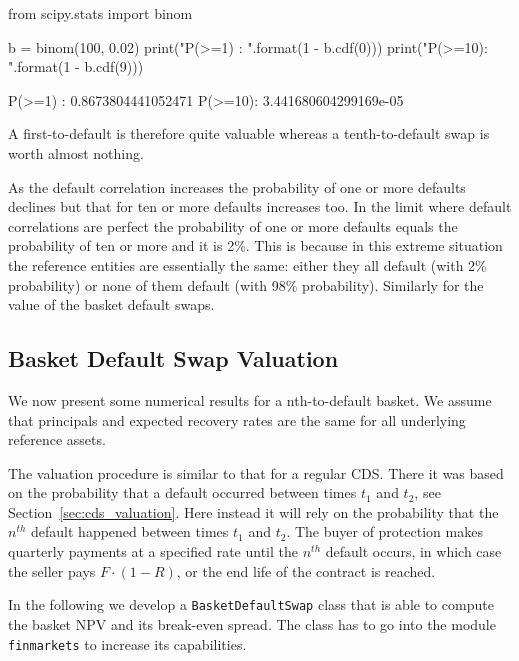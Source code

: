 \begin{ipython}
from scipy.stats import binom

b = binom(100, 0.02)
print("P(>=1) : {}".format(1 - b.cdf(0)))
print("P(>=10): {}".format(1 - b.cdf(9)))
\end{ipython}
\begin{ioutput}
P(>=1) : 0.8673804441052471
P(>=10): 3.441680604299169e-05
\end{ioutput}

A first-to-default is therefore quite valuable whereas a tenth-to-default swap is worth almost nothing.

As the default correlation increases the probability of one or more defaults declines but that for ten or more defaults increases too. In the limit where default correlations are perfect the probability of one or more defaults equals the probability of ten or more and it is 2\%. This is because in this extreme situation the reference entities are essentially the same: either they all default (with 2\% probability) or none of them default (with 98\% probability). Similarly for the value of the basket default swaps.

\subsection{Basket Default Swap Valuation}
\label{basket-cds-valuation-under-market-standard-model}
We now present some numerical results for a nth-to-default basket. We assume that principals and expected recovery rates are the same for all underlying reference assets. 

The valuation procedure is similar to that for a regular CDS. There it was based on the probability that a default occurred between times \(t_1\) and \(t_2\), see Section~\ref{sec:cds_valuation}. Here instead it will rely on the probability that the $n^{th}$ default happened between times \(t_1\) and \(t_2\). The buyer of protection makes quarterly payments at a specified rate until the $n^{th}$ default occurs, in which case the seller pays \(F\cdot(1-R)\), or the end life of the contract is reached. 

\begin{finmarkets}
In the following we develop a \texttt{BasketDefaultSwap} class that is able to compute the basket NPV and its break-even spread. 
The class has to go into the module \texttt{finmarkets} to increase its capabilities.
\end{finmarkets}

